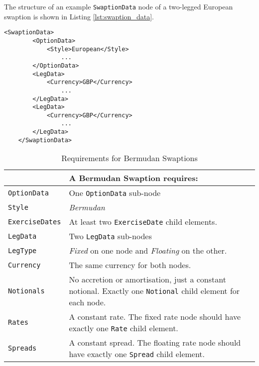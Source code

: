 The structure of an example \lstinline!SwaptionData!  node of a two-legged European swaption is shown in Listing \ref{lst:swaption_data}.  

\begin{lstlisting}[caption=SwaptionData, label=lst:swaption_data]
	<SwaptionData>
		<OptionData>
			<Style>European</Style>
				...
		</OptionData>
		<LegData>
			<Currency>GBP</Currency>
				...
		</LegData>
		<LegData>
			<Currency>GBP</Currency>
				...
		</LegData>
	</SwaptionData>
\end{lstlisting}

\begin{table}[H]
\centering
  \begin{tabu} to 0.9\linewidth {| X[-1.5,l,m] | X[-5,l,m] |}
    \hline
        & \bfseries{A Bermudan Swaption requires:} \\  \hline
    \lstinline!OptionData! & One \lstinline!OptionData! sub-node  \\  \hline
   \lstinline!Style! &  \emph{Bermudan}\\ \hline
    \lstinline!ExerciseDates! & At least two \lstinline!ExerciseDate! child elements.\\ \hline
    \lstinline!LegData! &  Two \lstinline!LegData! sub-nodes \\ \hline
    \lstinline!LegType! & \emph{Fixed} on one node and \emph{Floating} on the other.\\ \hline    
    \lstinline!Currency! & The same currency for both nodes.\\ \hline 
    \lstinline!Notionals! & No accretion or amortisation, just a constant notional. Exactly one \lstinline!Notional! child element for each node.\\ \hline
    \lstinline!Rates! & A constant rate. The fixed rate node should have exactly one \lstinline!Rate! child element.\\ \hline
    \lstinline!Spreads! &  A constant spread. The floating rate node should have exactly one \lstinline!Spread! child element.\\ \hline
  \end{tabu}
  \caption{Requirements for Bermudan Swaptions}
  \label{tab:bermudan_requirements}
\end{table}



